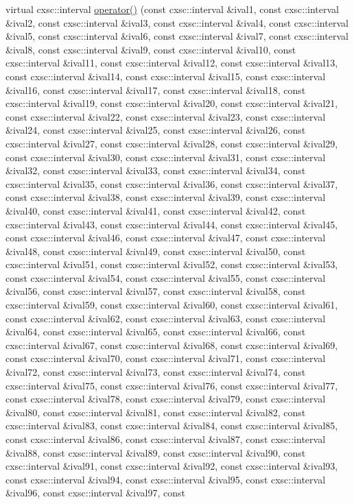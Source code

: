 \begin{DoxyCompactItemize}
virtual cxsc\-::interval \hyperlink{classRosenFobj1000D_a86034752b1c81741fd81edb9a7df3059}{operator()} (const cxsc\-::interval \&ival1, const cxsc\-::interval \&ival2, const cxsc\-::interval \&ival3, const cxsc\-::interval \&ival4, const cxsc\-::interval \&ival5, const cxsc\-::interval \&ival6, const cxsc\-::interval \&ival7, const cxsc\-::interval \&ival8, const cxsc\-::interval \&ival9, const cxsc\-::interval \&ival10, const cxsc\-::interval \&ival11, const cxsc\-::interval \&ival12, const cxsc\-::interval \&ival13, const cxsc\-::interval \&ival14, const cxsc\-::interval \&ival15, const cxsc\-::interval \&ival16, const cxsc\-::interval \&ival17, const cxsc\-::interval \&ival18, const cxsc\-::interval \&ival19, const cxsc\-::interval \&ival20, const cxsc\-::interval \&ival21, const cxsc\-::interval \&ival22, const cxsc\-::interval \&ival23, const cxsc\-::interval \&ival24, const cxsc\-::interval \&ival25, const cxsc\-::interval \&ival26, const cxsc\-::interval \&ival27, const cxsc\-::interval \&ival28, const cxsc\-::interval \&ival29, const cxsc\-::interval \&ival30, const cxsc\-::interval \&ival31, const cxsc\-::interval \&ival32, const cxsc\-::interval \&ival33, const cxsc\-::interval \&ival34, const cxsc\-::interval \&ival35, const cxsc\-::interval \&ival36, const cxsc\-::interval \&ival37, const cxsc\-::interval \&ival38, const cxsc\-::interval \&ival39, const cxsc\-::interval \&ival40, const cxsc\-::interval \&ival41, const cxsc\-::interval \&ival42, const cxsc\-::interval \&ival43, const cxsc\-::interval \&ival44, const cxsc\-::interval \&ival45, const cxsc\-::interval \&ival46, const cxsc\-::interval \&ival47, const cxsc\-::interval \&ival48, const cxsc\-::interval \&ival49, const cxsc\-::interval \&ival50, const cxsc\-::interval \&ival51, const cxsc\-::interval \&ival52, const cxsc\-::interval \&ival53, const cxsc\-::interval \&ival54, const cxsc\-::interval \&ival55, const cxsc\-::interval \&ival56, const cxsc\-::interval \&ival57, const cxsc\-::interval \&ival58, const cxsc\-::interval \&ival59, const cxsc\-::interval \&ival60, const cxsc\-::interval \&ival61, const cxsc\-::interval \&ival62, const cxsc\-::interval \&ival63, const cxsc\-::interval \&ival64, const cxsc\-::interval \&ival65, const cxsc\-::interval \&ival66, const cxsc\-::interval \&ival67, const cxsc\-::interval \&ival68, const cxsc\-::interval \&ival69, const cxsc\-::interval \&ival70, const cxsc\-::interval \&ival71, const cxsc\-::interval \&ival72, const cxsc\-::interval \&ival73, const cxsc\-::interval \&ival74, const cxsc\-::interval \&ival75, const cxsc\-::interval \&ival76, const cxsc\-::interval \&ival77, const cxsc\-::interval \&ival78, const cxsc\-::interval \&ival79, const cxsc\-::interval \&ival80, const cxsc\-::interval \&ival81, const cxsc\-::interval \&ival82, const cxsc\-::interval \&ival83, const cxsc\-::interval \&ival84, const cxsc\-::interval \&ival85, const cxsc\-::interval \&ival86, const cxsc\-::interval \&ival87, const cxsc\-::interval \&ival88, const cxsc\-::interval \&ival89, const cxsc\-::interval \&ival90, const cxsc\-::interval \&ival91, const cxsc\-::interval \&ival92, const cxsc\-::interval \&ival93, const cxsc\-::interval \&ival94, const cxsc\-::interval \&ival95, const cxsc\-::interval \&ival96, const cxsc\-::interval \&ival97, const 
\end{DoxyCompactItemize}
